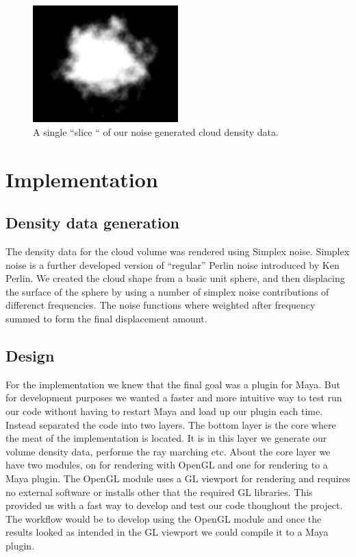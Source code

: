 \documentclass[11pt,twocolumn]{article}
\begin{document}
\begin{figure}[ht]
\includegraphics[width=0.5\textwidth]{figures/cumulus_slice.png}
\caption{A single ``slice `` of our noise generated cloud density data.}
\label{fig:cloud_slice}
\end{figure}

\section{Implementation}

\subsection{Density data generation}
The density data for the cloud volume was rendered using Simplex noise. Simplex noise is a further developed version of ``regular'' Perlin noise introduced by Ken Perlin. We created the cloud shape from a basic unit sphere, and then displacing the surface of the sphere by using a number of simplex noise contributions of differenct frequencies. The noise functions where weighted after frequency summed to form the final displacement amount.

\subsection{Design}
For the implementation we knew that the final goal was a plugin for Maya.
But for development purposes we wanted a faster and more intuitive way to test run our code without having to restart Maya and load up our plugin each time.
Instead separated the code into two layers. The bottom layer is the core where the meat of the implementation is located. It is in this layer we generate our volume density data, performe the ray marching etc. About the core layer we have two modules, on for rendering with OpenGL and one for rendering to a Maya plugin. The OpenGL module uses a GL viewport for rendering and requires no external software or installs other that the required GL libraries. This provided us with a fast way to develop and test our code thoughout the project. The workflow would be to develop using the OpenGL module and once the results looked as intended in the GL viewport we could compile it to a Maya plugin.
\\
\end{document}
